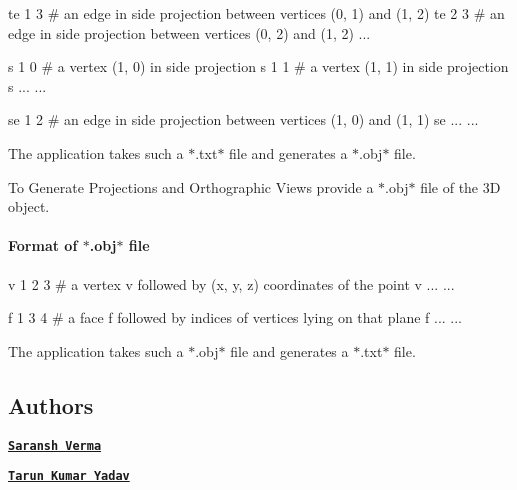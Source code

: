 te 1 3 \# an edge in side projection between vertices (0, 1) and (1, 2) te 2 3 \# an edge in side projection between vertices (0, 2) and (1, 2) ...

s 1 0 \# a vertex (1, 0) in side projection s 1 1 \# a vertex (1, 1) in side projection s ... ...

se 1 2 \# an edge in side projection between vertices (1, 0) and (1, 1) se ... ...

The application takes such a $\ast$.txt$\ast$ file and generates a $\ast$.obj$\ast$ file.


\begin{DoxyEnumerate}
\item To Generate Projections and Orthographic Views provide a $\ast$.obj$\ast$ file of the 3D object.
\end{DoxyEnumerate}

\paragraph*{Format of $\ast$.obj$\ast$ file}

v 1 2 3 \# a vertex \textquotesingle{}v\textquotesingle{} followed by (x, y, z) coordinates of the point v ... ...

f 1 3 4 \# a face \textquotesingle{}f\textquotesingle{} followed by indices of vertices lying on that plane f ... ...

The application takes such a $\ast$.obj$\ast$ file and generates a $\ast$.txt$\ast$ file.

\subsection*{Authors}


\begin{DoxyItemize}
\item {\bfseries \href{http://github.com/saranshiitd}{\tt Saransh Verma}}
\item {\bfseries \href{http://github.com/tarunyadav452}{\tt Tarun Kumar Yadav}} 
\end{DoxyItemize}